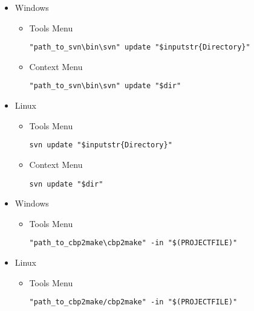 
\begin{itemize}
\item Windows
\begin{itemize}
\item Tools Menu
\begin{verbatim}
"path_to_svn\bin\svn" update "$inputstr{Directory}"
\end{verbatim}
\item Context Menu
\begin{verbatim}
"path_to_svn\bin\svn" update "$dir"
\end{verbatim}
\end{itemize}

\item Linux
\begin{itemize}
\item Tools Menu
\begin{verbatim}
svn update "$inputstr{Directory}"
\end{verbatim}
\item Context Menu
\begin{verbatim}
svn update "$dir"
\end{verbatim}
\end{itemize}
\end{itemize}


\label{sec:tool_cbp2make}

\begin{itemize}
\item Windows
\begin{itemize}
\item Tools Menu
\begin{verbatim}
"path_to_cbp2make\cbp2make" -in "$(PROJECTFILE)"
\end{verbatim}
\end{itemize}

\item Linux
\begin{itemize}
\item Tools Menu
\begin{verbatim}
"path_to_cbp2make/cbp2make" -in "$(PROJECTFILE)"
\end{verbatim}
\end{itemize}
\end{itemize}


